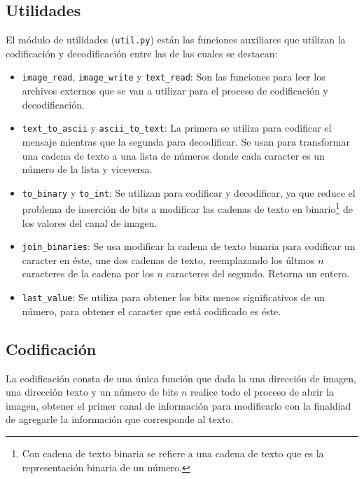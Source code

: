 \documentclass[conference]{IEEEtran}
\begin{document}
	\subsection*{Utilidades}
	El módulo de utilidades (\texttt{util.py}) están las funciones auxiliares que utilizan la codificación y decodificación entre las de las cuales se destacan:
	\begin{itemize}
	    \item \texttt{image\_read}\footnotemark, \texttt{image\_write} y \texttt{text\_read}: Son las funciones para leer los archivos externos que se van a utilizar para el proceso de codificación y decodificación.
         
	    	    
        \item \texttt{text\_to\_ascii} y \texttt{ascii\_to\_text}: La primera se utiliza para codificar el mensaje mientras que la segunda para decodificar. Se usan para transformar una cadena de texto a una lista de números donde cada caracter es un número de la lista y viceversa.
        
        \item \texttt{to\_binary} y \texttt{to\_int}: Se utilizan para codificar y decodificar, ya que reduce el problema de inserción de bits a modificar las cadenas de texto en binario\footnote{Con cadena de texto binaria se refiere a una cadena de texto que es la representación binaria de un número.} de los valores del canal de imagen.
        
        \item \texttt{join\_binaries}: Se usa modificar la cadena de texto binaria para codificar un caracter en éste, une dos cadenas de texto, reemplazando los últmos $n$ caracteres de la cadena por los $n$ caracteres del segundo. Retorna un entero.
        
        \item \texttt{last\_value}: Se utiliza para obtener los bits menos significativos de un número, para obtener el caracter que está codificado es éste.
	\end{itemize}
	
	\subsection*{Codificación}
        La codificación consta de una única función que dada la una dirección de imagen, una dirección texto y un número de bits $n$ realice todo el proceso de abrir la imagen, obtener el primer canal de información para modificarlo con la finaldiad de agregarle la información que corresponde al texto. \\
        
\end{document}
